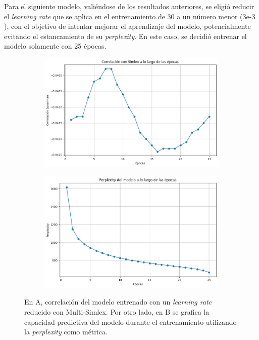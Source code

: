 Para el siguiente modelo, valiéndose de los resultados anteriores, se eligió reducir el 
\textit{learning rate} que se aplica en el entrenamiento de $30$ a un número menor 
($3\text{e-3}$), con el objetivo de intentar mejorar el aprendizaje del modelo, 
potencialmente evitando el estancamiento de su \textit{perplexity}. En este caso, se decidió 
entrenar el modelo solamente con 25 épocas.


\begin{figure}[htb]
    \centering
    \begin{subfigure}[b]{0.45\textwidth}
        \centering
        \includegraphics[width=1\textwidth]{imagenes/simlex_corr_lrreducido.png}
        \caption{}
        \label{fig:simlex_corr_lrreducido.png}
    \end{subfigure}
    \hfill
    \begin{subfigure}[b]{0.45\textwidth}
        \centering
        \includegraphics[width=1\textwidth]{imagenes/perp_lrreducido.png}
        \caption{}
        \label{fig:perp_lrreducido.png}
    \end{subfigure}
    \caption{En A, correlación del modelo entrenado con un \textit{learning rate} reducido con 
    Multi-Simlex. Por otro lado, en B se grafica la capacidad predictiva del modelo 
    durante el entrenamiento utilizando la \textit{perplexity} como métrica.}
    \label{fig:lrreducido}
\end{figure}

